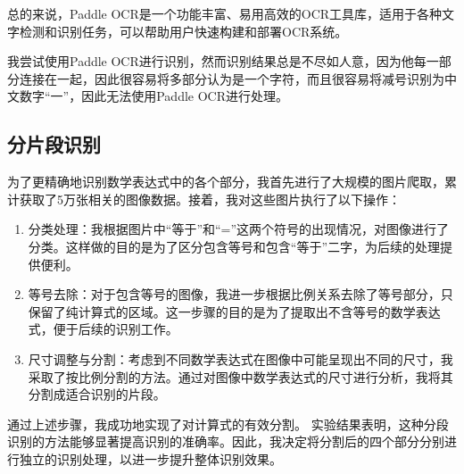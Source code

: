 总的来说，Paddle OCR是一个功能丰富、易用高效的OCR工具库，适用于各种文字检测和识别任务，可以帮助用户快速构建和部署OCR系统。

我尝试使用Paddle OCR进行识别，然而识别结果总是不尽如人意，因为他每一部分连接在一起，因此很容易将多部分认为是一个字符，而且很容易将减号识别为中文数字“一”，因此无法使用Paddle OCR进行处理。

\subsection{分片段识别}

为了更精确地识别数学表达式中的各个部分，我首先进行了大规模的图片爬取，累计获取了5万张相关的图像数据。接着，我对这些图片执行了以下操作：

\begin{enumerate}
	\item 分类处理：我根据图片中“等于”和“=”这两个符号的出现情况，对图像进行了分类。这样做的目的是为了区分包含等号和包含“等于”二字，为后续的处理提供便利。
	\item 等号去除：对于包含等号的图像，我进一步根据比例关系去除了等号部分，只保留了纯计算式的区域。这一步骤的目的是为了提取出不含等号的数学表达式，便于后续的识别工作。
	\item 尺寸调整与分割：考虑到不同数学表达式在图像中可能呈现出不同的尺寸，我采取了按比例分割的方法。通过对图像中数学表达式的尺寸进行分析，我将其分割成适合识别的片段。
\end{enumerate}

通过上述步骤，我成功地实现了对计算式的有效分割。
实验结果表明，这种分段识别的方法能够显著提高识别的准确率。因此，我决定将分割后的四个部分分别进行独立的识别处理，以进一步提升整体识别效果。
